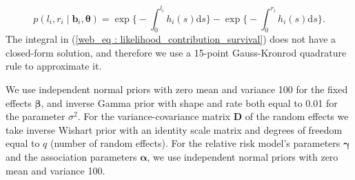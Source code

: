 \begin{equation}
\label{web_eq : likelihood_contribution_survival}
p(l_i,r_i\mid \boldsymbol{b}_i,\boldsymbol{\theta}) = \exp\Big\{-\int_0^{l_i} h_i(s)\mathrm{d}{s}\Big\} - \exp\Big\{-\int_0^{r_i}h_i(s)\mathrm{d}{s}\Big\}.
\end{equation}
The integral in (\ref{web_eq : likelihood_contribution_survival}) does not have a closed-form solution, and therefore we use a 15-point Gauss-Kronrod quadrature rule to approximate it.

We use independent normal priors with zero mean and variance 100 for the fixed effects $\boldsymbol{\beta}$, and inverse Gamma prior with shape and rate both equal to 0.01 for the parameter $\sigma^2$. For the variance-covariance matrix $\boldsymbol{D}$ of the random effects we take inverse Wishart prior with an identity scale matrix and degrees of freedom equal to $q$ (number of random effects). For the relative risk model's parameters $\boldsymbol{\gamma}$ and the association parameters $\boldsymbol{\alpha}$, we use independent normal priors with zero mean and variance 100.